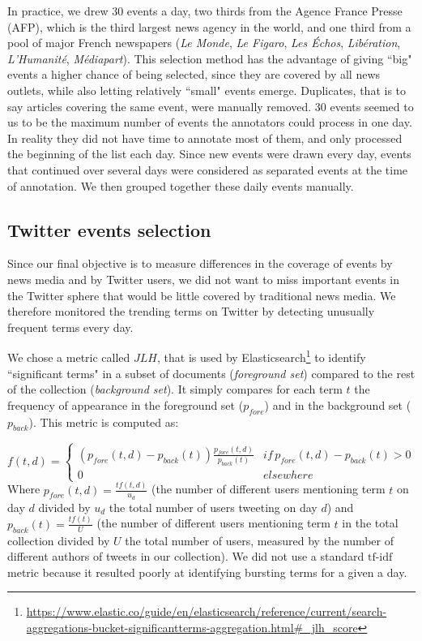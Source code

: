 In practice, we drew 30 events a day, two thirds from the Agence France Presse (AFP), which is the third largest news agency in the world, and one third from a pool of major French  newspapers (\textit{Le Monde}, \textit{Le Figaro}, \textit{Les Échos}, \textit{Libération}, \textit{L'Humanité}, \textit{Médiapart}). This selection method has the advantage of giving ``big" events a higher chance of being selected, since they are covered by all news outlets, while also letting relatively ``small" events emerge. Duplicates, that is to say articles covering the same event, were manually removed. 30 events seemed to us to be the maximum number of events the annotators could process in one day. In reality they did not have time to annotate most of them, and only processed the beginning of the list each day.
Since new events were drawn every day, events that continued over several days were considered as separated events at the time of annotation. We then grouped together these daily events manually.

\subsection{Twitter events selection}
\label{Twitter events selection}
Since our final objective is to measure differences in the coverage of events by news media and by Twitter users, we did not want to miss important events in the Twitter sphere that would be little covered by traditional news media. We therefore monitored the trending terms on Twitter by detecting unusually frequent terms every day. 


We chose a metric called $JLH$, that is used by Elasticsearch\footnote{\url{https://www.elastic.co/guide/en/elasticsearch/reference/current/search-aggregations-bucket-significantterms-aggregation.html\#_jlh_score}}  to identify ``significant terms" in a subset of documents (\textit{foreground set}) compared to the rest of the collection (\textit{background set}). It simply compares for each term $t$ the frequency of appearance in the foreground set ($p_{fore}$) and in the background set ($p_{back}$). This metric is computed as:

$$
f(t,d) = \left\{
	\begin{array}{ll}
		(p_{fore}(t,d) - p_{back}(t))\frac{p_{fore}(t,d)}{p_{back}(t)} & if\, p_{fore}(t,d) - p_{back}(t) > 0\\
		0 & elsewhere
	\end{array}
\right.
$$
Where $p_{fore}(t,d) = \frac{tf(t,d)}{u_d}$  (the number of different users mentioning term $t$ on day $d$ divided by $u_d$ the total number of users tweeting on day $d$) and $p_{back}(t)  = \frac{tf(t)}{U}$ (the number of different users mentioning term $t$ in the total collection divided by $U$  the total number of users, measured by the number of different authors of tweets in our collection). We did not use a standard $\mbox{tf-idf}$ metric because it resulted poorly at identifying bursting terms for a given a day.


